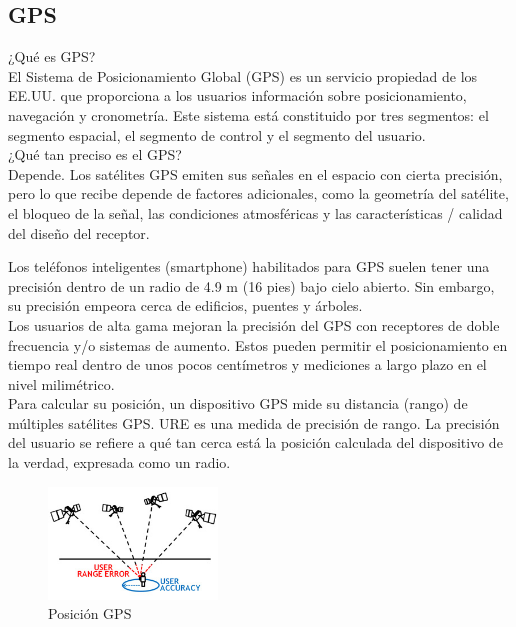 \subsection{GPS}
¿Qué es GPS?\\
El Sistema de Posicionamiento Global (GPS) es un servicio propiedad de los EE.UU. que proporciona a los usuarios información sobre posicionamiento, navegación y cronometría. Este sistema está constituido por tres segmentos: el segmento espacial, el segmento de control y el segmento del usuario.\\

¿Qué tan preciso es el GPS?\\
Depende. Los satélites GPS emiten sus señales en el espacio con cierta precisión, pero lo que recibe depende de factores adicionales, como la geometría del satélite, el bloqueo de la señal, las condiciones atmosféricas y las características / calidad del diseño del receptor.

Los teléfonos inteligentes (smartphone) habilitados para GPS suelen tener una precisión dentro de un radio de 4.9 m (16 pies) bajo cielo abierto. Sin embargo, su precisión empeora cerca de edificios, puentes y árboles.\\

Los usuarios de alta gama mejoran la precisión del GPS con receptores de doble frecuencia y/o sistemas de aumento. Estos pueden permitir el posicionamiento en tiempo real dentro de unos pocos centímetros y mediciones a largo plazo en el nivel milimétrico.\\

Para calcular su posición, un dispositivo GPS mide su distancia (rango) de múltiples satélites GPS. URE es una medida de precisión de rango. La precisión del usuario se refiere a qué tan cerca está la posición calculada del dispositivo de la verdad, expresada como un radio.\\

\begin{figure}[htbp!]
	\begin{center}
		\includegraphics[width=0.4\textwidth]{MarcoTeorico/imagenes/GPS}
		\caption{Posición GPS}
		\label{MT/SS/GPS}
	\end{center}
\end{figure}

